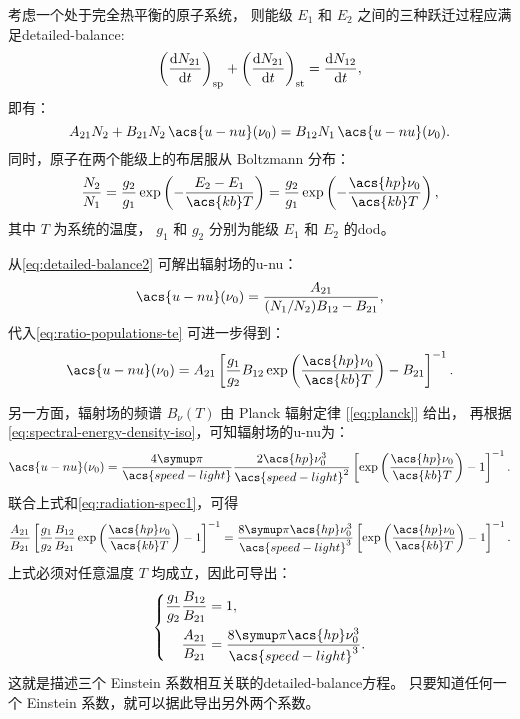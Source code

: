 考虑一个处于完全热平衡的原子系统，
则能级 $E_1$ 和 $E_2$ 之间的三种跃迁过程应满足\acf{detailed-balance}:
\begin{equation}
  \label{eq:detailed-balance1}
  \left( \frac{\mathrm{d}N_{21}}{\mathrm{d}t} \right)_{\mathrm{sp}}
    + \left( \frac{\mathrm{d}N_{21}}{\mathrm{d}t} \right)_{\mathrm{st}} = \frac{\mathrm{d}N_{12}}{\mathrm{d}t} ,
\end{equation}
即有：
\begin{equation}
  \label{eq:detailed-balance2}
  A_{21} N_2 + B_{21} N_2 \, \acs{u-nu}(\nu_0)
    = B_{12} N_1 \, \acs{u-nu}(\nu_0) .
\end{equation}
同时，原子在两个能级上的布居服从 Boltzmann 分布：
\begin{equation}
  \label{eq:ratio-populations-te}
  \frac{N_2}{N_1}
    = \frac{g_2}{g_1} \exp\left( - \frac{E_2-E_1}{\acs{kb} T} \right)
    = \frac{g_2}{g_1} \exp\left( - \frac{\acs{hp} \nu_0}{\acs{kb} T} \right) ,
\end{equation}
其中 $T$ 为系统的温度，
$g_1$ 和 $g_2$ 分别为能级 $E_1$ 和 $E_2$ 的\acf{dod}。

从\autoref{eq:detailed-balance2} 可解出辐射场的\acl{u-nu}：
\begin{equation}
  \acs{u-nu}(\nu_0) = \frac{A_{21}}{(N_1/N_2) B_{12} - B_{21}} ,
\end{equation}
代入\autoref{eq:ratio-populations-te} 可进一步得到：
\begin{equation}
  \label{eq:radiation-spec1}
  \acs{u-nu}(\nu_0) = A_{21} \left[ \frac{g_1}{g_2} B_{12}
    \exp\left( \frac{\acs{hp} \nu_0}{\acs{kb} T} \right)
    - B_{21} \right]^{-1} .
\end{equation}

另一方面，辐射场的频谱 $B_{\nu}(T)$ 由 Planck 辐射定律 [\autoref{eq:planck}] 给出，
再根据\autoref{eq:spectral-energy-density-iso}，可知辐射场的\acl{u-nu}为：
\begin{equation}
  \label{eq:radiation-spec2}
  \acs{u-nu}(\nu_0) = \frac{4\Cpi}{\acs{speed-light}}
    \frac{2 \acs{hp} \nu_0^3}{\acs{speed-light}^2}
    \left[ \exp\left( \frac{\acs{hp} \nu_0}{\acs{kb} T} \right)
      - 1 \right]^{-1} .
\end{equation}
联合上式和\autoref{eq:radiation-spec1}，可得
\begin{equation}
  \frac{A_{21}}{B_{21}} \left[ \frac{g_1}{g_2} \frac{B_{12}}{B_{21}}
    \exp\left( \frac{\acs{hp} \nu_0}{\acs{kb} T} \right) - 1 \right]^{-1}
  = \frac{8\Cpi \acs{hp} \nu_0^3}{\acs{speed-light}^3}
    \left[ \exp\left( \frac{\acs{hp} \nu_0}{\acs{kb} T} \right)
      - 1 \right]^{-1} .
\end{equation}
上式必须对任意温度 $T$ 均成立，因此可导出：
\begin{equation}
  \label{eq:detailed-balance}
  \left\{
    \begin{aligned}
      \frac{g_1}{g_2} \frac{B_{12}}{B_{21}} & = 1 , \\
      \frac{A_{21}}{B_{21}} & =
        \frac{8\Cpi \acs{hp} \nu_0^3}{\acs{speed-light}^3} .
    \end{aligned}
  \right.
\end{equation}
这就是描述三个 Einstein 系数相互关联的\ac{detailed-balance}方程。
只要知道任何一个 Einstein 系数，就可以据此导出另外两个系数。

